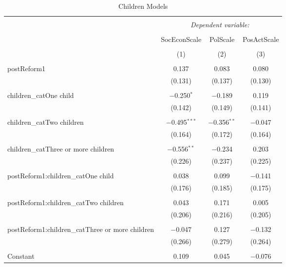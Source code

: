 
\begin{table}[!htbp] \centering 
  \caption{Children Models} 
  \label{} 
\begin{tabular}{@{\extracolsep{5pt}}lccc} 
\\[-1.8ex]\hline 
\hline \\[-1.8ex] 
 & \multicolumn{3}{c}{\textit{Dependent variable:}} \\ 
\cline{2-4} 
\\[-1.8ex] & SocEconScale & PolScale & PosActScale \\ 
\\[-1.8ex] & (1) & (2) & (3)\\ 
\hline \\[-1.8ex] 
 postReform1 & 0.137 & 0.083 & 0.080 \\ 
  & (0.131) & (0.137) & (0.130) \\ 
  & & & \\ 
 children\_catOne child & $-$0.250$^{*}$ & $-$0.189 & 0.119 \\ 
  & (0.142) & (0.149) & (0.141) \\ 
  & & & \\ 
 children\_catTwo children & $-$0.495$^{***}$ & $-$0.356$^{**}$ & $-$0.047 \\ 
  & (0.164) & (0.172) & (0.164) \\ 
  & & & \\ 
 children\_catThree or more children & $-$0.556$^{**}$ & $-$0.234 & 0.203 \\ 
  & (0.226) & (0.237) & (0.225) \\ 
  & & & \\ 
 postReform1:children\_catOne child & 0.038 & 0.099 & $-$0.141 \\ 
  & (0.176) & (0.185) & (0.175) \\ 
  & & & \\ 
 postReform1:children\_catTwo children & 0.043 & 0.171 & 0.005 \\ 
  & (0.206) & (0.216) & (0.205) \\ 
  & & & \\ 
 postReform1:children\_catThree or more children & $-$0.047 & 0.127 & $-$0.132 \\ 
  & (0.266) & (0.279) & (0.264) \\ 
  & & & \\ 
 Constant & 0.109 & 0.045 & $-$0.076 \\ 

\end{tabular}
\end{table}

